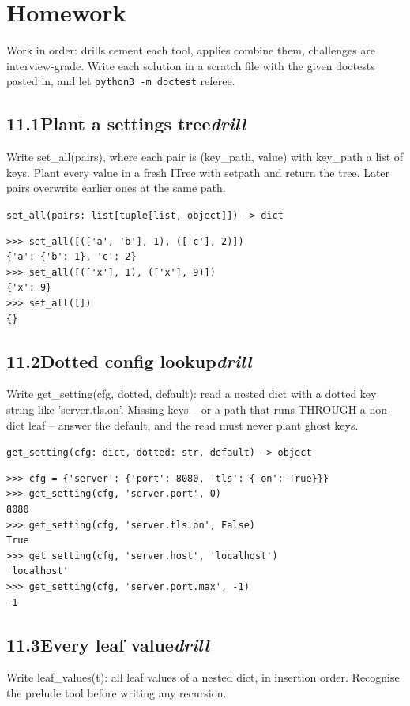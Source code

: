\documentclass[10pt,letterpaper]{book}
\begin{document}
\section{Homework}
Work in order: drills cement each tool, applies combine them,
challenges are interview-grade. Write each solution in a scratch file with
the given doctests pasted in, and let \texttt{python3 -m doctest} referee.
\subsection*{11.1\quad Plant a settings tree\hfill\textnormal{\textit{drill}}}
Write set\_all(pairs), where each pair is (key\_path, value) with key\_path a list of keys. Plant every value in a fresh ITree with setpath and return the tree. Later pairs overwrite earlier ones at the same path.

\noindent\texttt{set\_all(pairs: list[tuple[list, object]]) -> dict}
\begin{lstlisting}[style=ex]
>>> set_all([(['a', 'b'], 1), (['c'], 2)])
{'a': {'b': 1}, 'c': 2}
>>> set_all([(['x'], 1), (['x'], 9)])
{'x': 9}
>>> set_all([])
{}
\end{lstlisting}
\subsection*{11.2\quad Dotted config lookup\hfill\textnormal{\textit{drill}}}
Write get\_setting(cfg, dotted, default): read a nested dict with a dotted key string like 'server.tls.on'. Missing keys -- or a path that runs THROUGH a non-dict leaf -- answer the default, and the read must never plant ghost keys.

\noindent\texttt{get\_setting(cfg: dict, dotted: str, default) -> object}
\begin{lstlisting}[style=ex]
>>> cfg = {'server': {'port': 8080, 'tls': {'on': True}}}
>>> get_setting(cfg, 'server.port', 0)
8080
>>> get_setting(cfg, 'server.tls.on', False)
True
>>> get_setting(cfg, 'server.host', 'localhost')
'localhost'
>>> get_setting(cfg, 'server.port.max', -1)
-1
\end{lstlisting}

\subsection*{11.3\quad Every leaf value\hfill\textnormal{\textit{drill}}}
Write leaf\_values(t): all leaf values of a nested dict, in insertion order. Recognise the prelude tool before writing any recursion.
\end{document}
